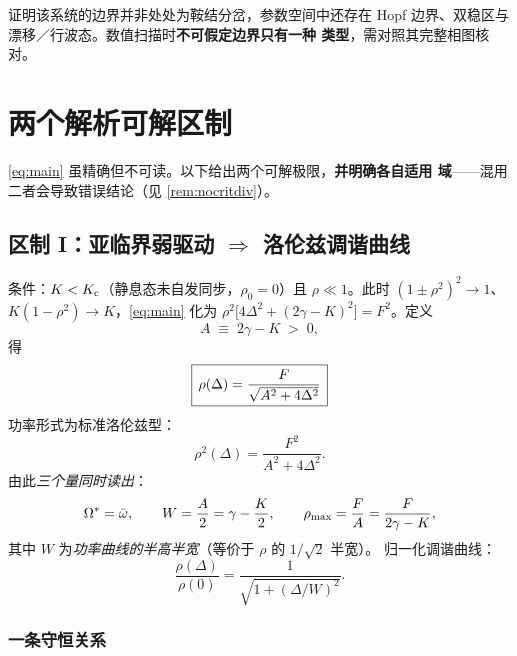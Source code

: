 \begin{remark}[边界类型的警告]\label{rem:boundary}
\citet{Childs2008} 证明该系统的边界并非处处为鞍结分岔，参数空间中还存在
Hopf 边界、双稳区与漂移／行波态。数值扫描时\textbf{不可假定边界只有一种
类型}，需对照其完整相图核对。
\end{remark}

\section{两个解析可解区制}
\label{sec:regimes}

\cref{eq:main} 虽精确但不可读。以下给出两个可解极限，\textbf{并明确各自适用
域}——混用二者会导致错误结论（见 \cref{rem:nocritdiv}）。

\subsection{区制 I：亚临界弱驱动 $\Rightarrow$ 洛伦兹调谐曲线}
\label{sec:regimeI}

条件：$K<K_{\mathrm{c}}$（静息态未自发同步，$\rho_0=0$）且 $\rho\ll1$。此时
$(1\pm\rho^2)^2\to1$、$K(1-\rho^2)\to K$，\cref{eq:main} 化为
$\rho^2\bigl[4\Delta^2+(2\gamma-K)^2\bigr]=F^2$。定义
%
\begin{equation*}
A\;\equiv\;2\gamma-K\;>\;0 ,
\end{equation*}
%
得
%
\begin{equation}\label{eq:regimeI}
\boxed{\,\rho(\Delta)=\frac{F}{\sqrt{A^2+4\Delta^2}}\,}
\end{equation}
%
功率形式为标准洛伦兹型：
%
\begin{equation}\label{eq:power}
\rho^2(\Delta)=\frac{F^2}{A^2+4\Delta^2} .
\end{equation}
%
由此\emph{三个量同时读出}：
%
\begin{equation}\label{eq:three}
\Omega^{*}=\bar{\omega} ,
\qquad
W=\frac{A}{2}=\gamma-\frac{K}{2} ,
\qquad
\rho_{\max}=\frac{F}{A}=\frac{F}{2\gamma-K} ,
\end{equation}
%
其中 $W$ 为\emph{功率曲线的半高半宽}（等价于 $\rho$ 的 $1/\sqrt2$ 半宽）。
归一化调谐曲线：
%
\begin{equation}\label{eq:normtune}
\frac{\rho(\Delta)}{\rho(0)}=\frac{1}{\sqrt{1+(\Delta/W)^2}} .
\end{equation}

\subsubsection{一条守恒关系}

